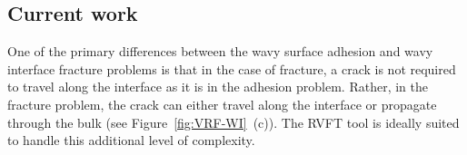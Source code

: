 \documentclass[10pt,letterpaper]{article}
\begin{document}
\subsection{Current work}
 One of the primary differences between the wavy surface adhesion and wavy interface fracture problems is that in the case of fracture, a crack is not required to travel along the interface as it is in the adhesion problem. 
 Rather, in the fracture problem, the crack can either travel along the interface or propagate through the bulk (see Figure~\ref{fig:VRF-WI}~(c)). The RVFT tool is ideally suited to handle this additional level of complexity.



\end{document}
